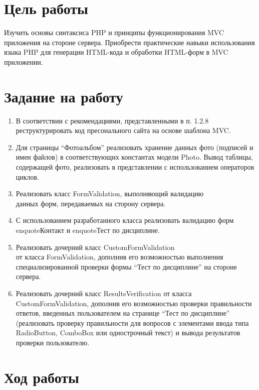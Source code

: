 \documentclass[a4paper,14pt]{extarticle}
\begin{document}


\section{Цель работы}
Изучить  основы синтаксиса PHP и принципы функционирования MVC приложения на
стороне сервера. Приобрести практические навыки использования языка PHP для
генерации HTML-кода и обработки HTML-форм в MVC приложении.

\section{Задание на работу}
\begin{enumerate}
    \item В соответствии с рекомендациями, представленными в п. 1.2.8
          реструктурировать код пресонального сайта на основе шаблона MVC.
    \item Для страницы \enquote{Фотоальбом} реализовать хранение данных фото
          (подписей и имен файлов) в соответствующих константах модели Photo.
          Вывод таблицы, содержащей фото, реализовать в представлении с
          использованием операторов циклов.
    \item Реализовать класс FormValidation, выполняющий валидацию \\данных форм,
          передаваемых на сторону сервера.
    \item С использованием разработанного класса реализовать валидацию форм
          enquote{Контакт} и enquote{Тест по дисциплине}.
    \item Реализовать дочерний класс CustomFormValidation \\от класса
          FormValidation, дополнив его возможностью выполнения специализированной
          проверки формы \enquote{Тест по дисциплине} на стороне сервера.
    \item Реализовать дочерний класс ResultsVerification от класса\\
          CustomFormValidation, дополнив его возможностью проверки правильности
          ответов, введенных пользователем на странице \enquote{Тест по дисциплине}
          (реализовать проверку правильности для вопросов с элементами ввода типа
          RadioButton, ComboBox или однострочный текст) и вывода результатов проверки
          пользователю.
\end{enumerate}
\pagebreak

\section{Ход работы}
\end{document}
